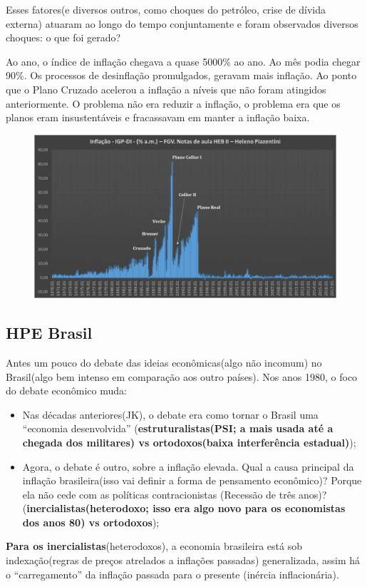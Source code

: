 \documentclass[a4paper,12pt]{article}[abntex2]
\begin{document}
Esses fatores(e diversos outros, como choques do petróleo, crise de dívida externa) atuaram ao longo do tempo conjuntamente e foram observados diversos choques: o que foi gerado?

Ao ano, o índice de inflação chegava a quase 5000\% ao ano. Ao mês podia chegar 90\%. Os processos de desinflação promulgados, geravam mais inflação. Ao ponto que o Plano Cruzado acelerou a inflação a níveis que não foram atingidos anteriormente. O problema não era reduzir a inflação, o problema era que os planos eram insustentáveis e fracassavam em manter a inflação baixa.

\begin{figure}[H]
    \centering
    \includegraphics[width=0.7\linewidth]{Imagens/a10i1.png}
\end{figure}

\subsection{\textbf{HPE Brasil}}

Antes um pouco do debate das ideias econômicas(algo não incomum) no Brasil(algo bem intenso em comparação aos outro países). Nos anos 1980, o foco do debate econômico muda:\begin{itemize}
    \item Nas décadas anteriores(JK), o debate era como tornar o Brasil uma ``economia desenvolvida'' (\textbf{estruturalistas(PSI; a mais usada até a chegada dos militares) vs ortodoxos(baixa interferência estadual)});
    \item Agora, o debate é outro, sobre a inflação elevada. Qual a causa principal da inflação brasileira(isso vai definir a forma de pensamento econômico)? Porque ela não cede com as políticas contracionistas (Recessão de três anos)?(\textbf{inercialistas(heterodoxo; isso era algo novo para os economistas dos anos 80) vs ortodoxos});
\end{itemize}

\textbf{Para os inercialistas}(heterodoxos), a economia brasileira está sob indexação(regras de preços atrelados a inflações passadas) generalizada, assim há o ``carregamento'' da inflação passada para o presente (inércia inflacionária).
\end{document}
